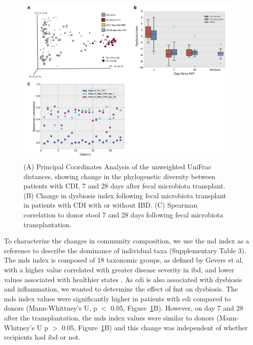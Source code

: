 \begin{figure}
\centering
\includegraphics[width=0.8\textheight]{fmt-figures/figure-1}
\caption[Dysbiosis index and beta-diversity summaries pre- and post-fecal microbiota transplantation]{(A) Principal Coordinates Analysis of the unweighted UniFrac distances, showing change in the phylogenetic diversity between patients with CDI, 7 and 28 days after fecal microbiota transplant. (B) Change in dysbiosis index following fecal microbiota transplant in patients with CDI with or without IBD. (C) Spearman correlation to donor stool 7 and 28 days following fecal microbiota transplantation.}
\label{fmt-fig1}
\end{figure}

To characterize the changes in community composition, we use the \gls{md} index as a reference to describe the dominance of individual taxa (Supplementary Table 3). The \glspl{md} index is composed of 18 taxonomic groups, as defined by Gevers et al, with a higher value correlated with greater disease severity in \gls{ibd}, and lower values associated with healthier states \cite{RN154}. As \gls{cdi} is also associated with dysbiosis and inflammation, we wanted to determine the effect of \gls{fmt} on dysbiosis. The \glspl{md} index values were significantly higher in patients with \gls{cdi} compared to donors (Mann-Whittney's U, p $<$ 0.05, Figure~\ref{fmt-fig1}B). However, on day 7 and 28 after the transplantation, the \glspl{md} index values were similar to donors (Mann-Whitney's U p $>$ 0.05, Figure~\ref{fmt-fig1}B) and this change was independent of whether recipients had \gls{ibd} or not. 

